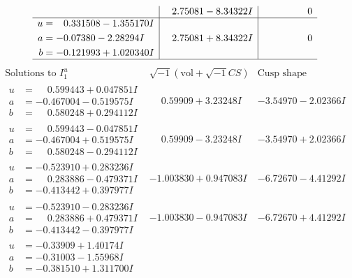 \documentclass[1p]{elsarticle_modified}
\theoremstyle{definition}
\newcommand{\I}{\sqrt{-1}}
\begin{document}
$$\begin{array}{c|c|c}
 & \phantom{-}2.75081 - 8.34322 I & \phantom{-0.000000 } 0 \\ \hline\begin{aligned}
u &= \phantom{-}0.331508 - 1.355170 I \\
a &= -0.07380 - 2.28294 I \\
b &= -0.121993 + 1.020340 I\end{aligned}
 & \phantom{-}2.75081 + 8.34322 I & \phantom{-0.000000 } 0\\
 \hline 
 \end{array}$$\newpage$$\begin{array}{c|c|c}  
\text{Solutions to }I^u_{1}& \I (\text{vol} + \sqrt{-1}CS) & \text{Cusp shape}\\
 \hline 
\begin{aligned}
u &= \phantom{-}0.599443 + 0.047851 I \\
a &= -0.467004 - 0.519575 I \\
b &= \phantom{-}0.580248 + 0.294112 I\end{aligned}
 & \phantom{-}0.59909 + 3.23248 I & -3.54970 - 2.02366 I \\ \hline\begin{aligned}
u &= \phantom{-}0.599443 - 0.047851 I \\
a &= -0.467004 + 0.519575 I \\
b &= \phantom{-}0.580248 - 0.294112 I\end{aligned}
 & \phantom{-}0.59909 - 3.23248 I & -3.54970 + 2.02366 I \\ \hline\begin{aligned}
u &= -0.523910 + 0.283236 I \\
a &= \phantom{-}0.283886 - 0.479371 I \\
b &= -0.413442 + 0.397977 I\end{aligned}
 & -1.003830 + 0.947083 I & -6.72670 - 4.41292 I \\ \hline\begin{aligned}
u &= -0.523910 - 0.283236 I \\
a &= \phantom{-}0.283886 + 0.479371 I \\
b &= -0.413442 - 0.397977 I\end{aligned}
 & -1.003830 - 0.947083 I & -6.72670 + 4.41292 I \\ \hline\begin{aligned}
u &= -0.33909 + 1.40174 I \\
a &= -0.31003 - 1.55968 I \\
b &= -0.381510 + 1.311700 I\end{aligned}

\end{array}$$
\end{document}
